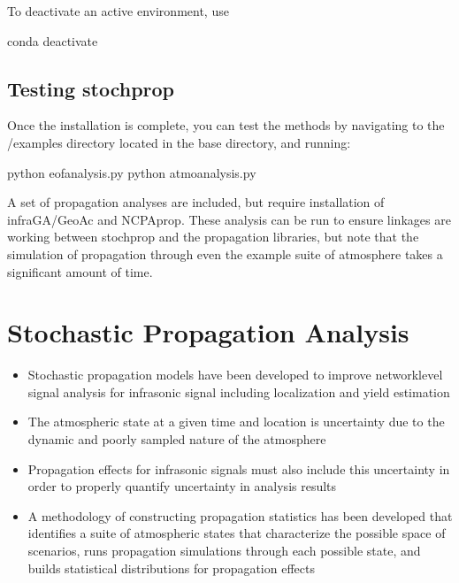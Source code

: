 \documentclass[letterpaper,10pt,english]{sphinxmanual}
\begin{document}
To deactivate an active environment, use

\begin{sphinxVerbatim}[commandchars=\\\{\}]
\PYGZgt{}\PYGZgt{} conda deactivate
\end{sphinxVerbatim}


\subsection{Testing stochprop}
\label{\detokenize{installation:testing-stochprop}}
Once the installation is complete, you can test the methods by navigating to the /examples directory located in the base directory, and running:

\begin{sphinxVerbatim}[commandchars=\\\{\}]
\PYGZgt{}\PYGZgt{} python eof\PYGZus{}analysis.py
\PYGZgt{}\PYGZgt{} python atmo\PYGZus{}analysis.py
\end{sphinxVerbatim}

A set of propagation analyses are included, but require installation of infraGA/GeoAc and NCPAprop.  These analysis can be run to ensure linkages are
working between stochprop and the propagation libraries, but note that the simulation of propagation through even the example suite of atmosphere
takes a significant amount of time.


\section{Stochastic Propagation Analysis}
\label{\detokenize{analysis:stochastic-propagation-analysis}}\label{\detokenize{analysis:analysis}}\label{\detokenize{analysis::doc}}\begin{itemize}
\item {} 
Stochastic propagation models have been developed to improve network\sphinxhyphen{}level signal analysis for infrasonic signal including localization and yield estimation

\item {} 
The atmospheric state at a given time and location is uncertainty due to the dynamic and poorly sampled nature of the atmosphere

\item {} 
Propagation effects for infrasonic signals must also include this uncertainty in order to properly quantify uncertainty in analysis results

\item {} 
A methodology of constructing propagation statistics has been developed that identifies a suite of atmospheric states that characterize the possible space of scenarios, runs propagation simulations through each possible state, and builds statistical distributions for propagation effects

\end{itemize}
\end{document}
